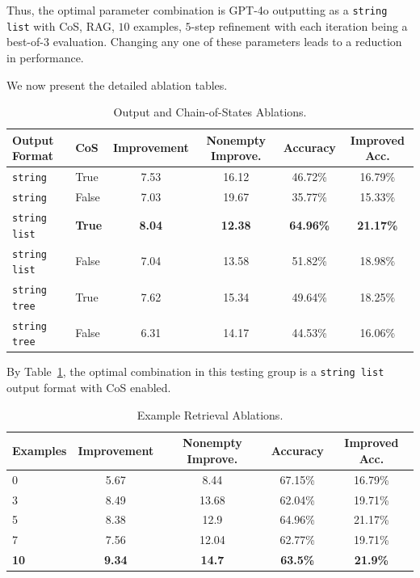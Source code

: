 Thus, the optimal parameter combination is GPT-4o outputting as a \texttt{string list} with CoS, RAG, $10$ examples, $5$-step refinement with each iteration being a best-of-$3$ evaluation. Changing any one of these parameters leads to a reduction in performance.

We now present the detailed ablation tables.

\begin{table}[ht]
\caption{Output and Chain-of-States Ablations.}
\label{tab:abl-cos}
\centering
\small
\begin{tabular}{ll|cccc}
\toprule
Output Format & CoS & Improvement & Nonempty Improve. & Accuracy & Improved Acc.\\
\midrule
\texttt{string} & True & 7.53 & 16.12 & 46.72\% & 16.79\% \\
\texttt{string} & False & 7.03 & 19.67 & 35.77\% & 15.33\% \\
\texttt{string list} & \textbf{True} & \textbf{8.04} & \textbf{12.38} & \textbf{64.96\%} & \textbf{21.17\%} \\
\texttt{string list} & False & 7.04 & 13.58 & 51.82\% & 18.98\% \\
\texttt{string tree} & True & 7.62 & 15.34 & 49.64\% & 18.25\% \\
\texttt{string tree} & False & 6.31 & 14.17 & 44.53\% & 16.06\% \\
\bottomrule
\end{tabular}
\end{table}

By Table~\ref{tab:abl-cos}, the optimal combination in this testing group is a \texttt{string list} output format with CoS enabled.

\begin{table}[h]
\caption{Example Retrieval Ablations.}
\label{tab:abl-ex}
\centering
\small
\begin{tabular}{l|cccc}
\toprule
Examples & Improvement & Nonempty Improve. & Accuracy & Improved Acc.\\
\midrule
0 & 5.67 & 8.44 & 67.15\% & 16.79\% \\
3 & 8.49 & 13.68 & 62.04\% & 19.71\% \\
5 & 8.38 & 12.9 & 64.96\% & 21.17\% \\
7 & 7.56 & 12.04 & 62.77\% & 19.71\% \\
\textbf{10} & \textbf{9.34} & \textbf{14.7} & \textbf{63.5\%} & \textbf{21.9\%} \\
\bottomrule
\end{tabular}
\end{table}

